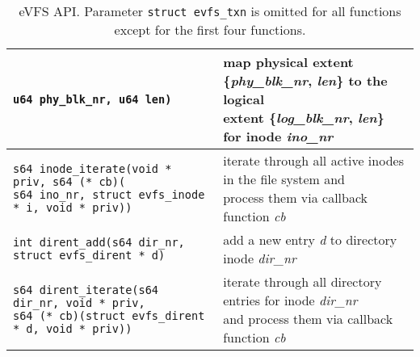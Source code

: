 \begin{table*}
\begin{center}
\begin{small}
\begin{tabular}[t]{|l|l|}
{\hspace{7.35em}\texttt{u64 phy\_blk\_nr, u64 len)}} & \makecell[l]{map physical extent \{\textit{phy\_blk\_nr}, \textit{len}\} to the logical \\ extent \{\textit{log\_blk\_nr}, \textit{len}\} for inode \textit{ino\_nr}} \\
\hline 
\makecell[l]{\texttt{s64 inode\_iterate(void * priv, s64 (* cb)(} \\ 
\hspace{1em}\texttt{s64 ino\_nr, struct evfs\_inode * i, void * priv))}} & \makecell[l]{iterate through all active inodes in the file system and \\ process them via callback function \textit{cb}} \\
\hline
\hline
\texttt{int dirent\_add(s64 dir\_nr, struct evfs\_dirent * d)} & add a new entry \textit{d} to directory inode \textit{dir\_nr} \\
\hline 
\makecell[l]{\texttt{s64 dirent\_iterate(s64 dir\_nr, void * priv,} \\ 
\hspace{1em}\texttt{s64 (* cb)(struct evfs\_dirent * d, void * priv))}} & \makecell[l]{iterate through all directory entries for inode \textit{dir\_nr} \\ and process them via callback function \textit{cb}} \\
\hline
\end{tabular}
\end{small}
\end{center}
\vspace{-16pt}
\caption{\label{tab:evfs-api}eVFS API. Parameter \texttt{struct evfs\_txn} is omitted for all functions except for the first four functions.}
\vspace{-6pt}
\end{table*}

